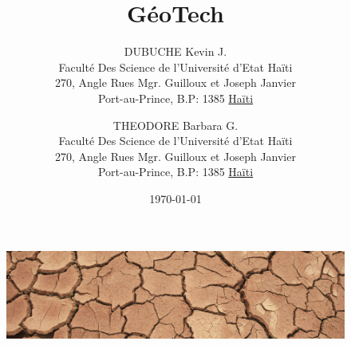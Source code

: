 \documentclass[a4paper,12pt]{report}
\begin{document}
\begin{figure}[t]
        \centering
        \includegraphics[width=2\textwidth]{image_fond}
        \label{image-GIS}
        \end{figure}

\title{GéoTech}
\author{
        DUBUCHE Kevin J. \\
        Faculté Des Science de l'Université d'Etat Haïti\\
        270, Angle Rues Mgr. Guilloux et Joseph Janvier\\
        Port-au-Prince, B.P: 1385 \underline{Haïti}
        \and
        THEODORE Barbara G.\\
        Faculté Des Science de l'Université d'Etat Haïti\\
        270, Angle Rues Mgr. Guilloux et Joseph Janvier \\
        Port-au-Prince, B.P: 1385  \underline{Haïti}
}
\date{\today}
\maketitle

\tableofcontents
\newpage
{}
























\end{document}
